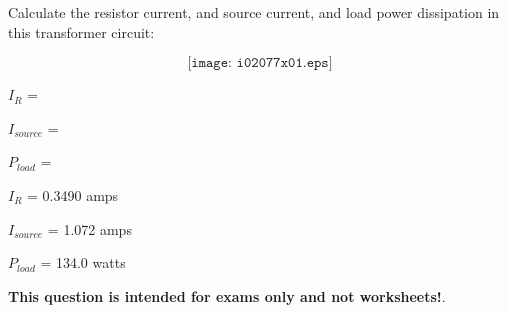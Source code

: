 

Calculate the resistor current, and source current, and load power dissipation in this transformer circuit:

$$\texttt{[image: i02077x01.eps]}$$

$I_R$ = 

\vskip 10pt

$I_{source}$ = 

\vskip 10pt

$P_{load}$ = 







$I_R$ = 0.3490 amps

\vskip 10pt

$I_{source}$ = 1.072 amps

\vskip 10pt

$P_{load}$ = 134.0 watts







{\bf This question is intended for exams only and not worksheets!}.


